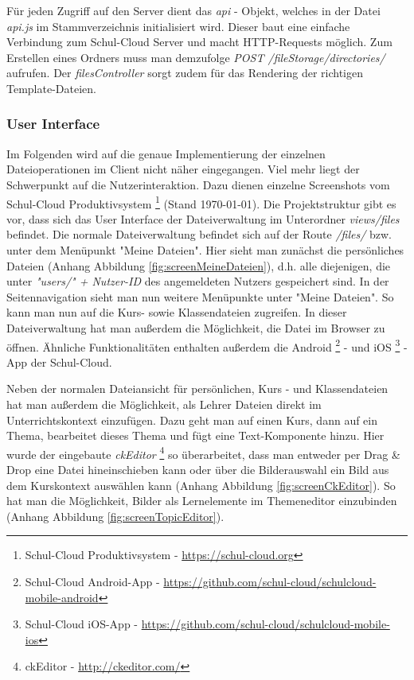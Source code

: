 Für jeden Zugriff auf den Server dient das \textit{api} - Objekt, welches in der Datei \textit{api.js} im Stammverzeichnis initialisiert wird. Dieser baut eine einfache Verbindung zum Schul-Cloud Server und macht HTTP-Requests möglich. Zum Erstellen eines Ordners muss man demzufolge \textit{POST /fileStorage/directories/} aufrufen. Der \textit{filesController} sorgt zudem für das Rendering der richtigen Template-Dateien.

\subsubsection{User Interface}
\label{sec:userinterface}
Im Folgenden wird auf die genaue Implementierung der einzelnen Dateioperationen im Client nicht näher eingegangen. Viel mehr liegt der Schwerpunkt auf die Nutzerinteraktion. Dazu dienen einzelne Screenshots vom Schul-Cloud Produktivsystem \footnote{Schul-Cloud Produktivsystem - \url{https://schul-cloud.org}} (Stand \today). Die Projektstruktur gibt es vor, dass sich das User Interface der Dateiverwaltung im Unterordner \textit{views/files} befindet. Die normale Dateiverwaltung befindet sich auf der Route \textit{/files/} bzw. unter dem Menüpunkt "Meine Dateien". Hier sieht man zunächst die persönliches Dateien (Anhang Abbildung \ref{fig:screenMeineDateien}), d.h. alle diejenigen, die unter \textit{"users/" + Nutzer-ID} des angemeldeten Nutzers gespeichert sind. In der Seitennavigation sieht man nun weitere Menüpunkte unter "Meine Dateien". So kann man nun auf die Kurs- sowie Klassendateien zugreifen. In dieser Dateiverwaltung hat man außerdem die Möglichkeit, die Datei im Browser zu öffnen. Ähnliche Funktionalitäten enthalten außerdem die Android \footnote{Schul-Cloud Android-App - \url{https://github.com/schul-cloud/schulcloud-mobile-android}} - und iOS \footnote{Schul-Cloud iOS-App - \url{https://github.com/schul-cloud/schulcloud-mobile-ios}} - App der Schul-Cloud.

Neben der normalen Dateiansicht für persönlichen, Kurs - und Klassendateien hat man außerdem die Möglichkeit, als Lehrer Dateien direkt im Unterrichtskontext einzufügen. Dazu geht man auf einen Kurs, dann auf ein Thema, bearbeitet dieses Thema und fügt eine Text-Komponente hinzu. Hier wurde der eingebaute \textit{ckEditor} \footnote{ckEditor - \url{http://ckeditor.com/}} so überarbeitet, dass man entweder per Drag \& Drop eine Datei hineinschieben kann oder über die Bilderauswahl ein Bild aus dem Kurskontext auswählen kann (Anhang Abbildung \ref{fig:screenCkEditor}). So hat man die Möglichkeit, Bilder als Lernelemente im Themeneditor einzubinden (Anhang Abbildung \ref{fig:screenTopicEditor}).

